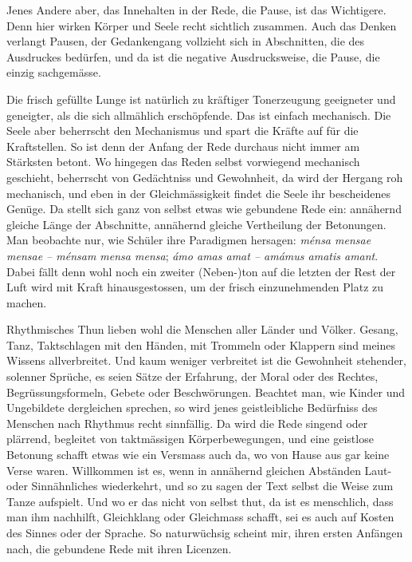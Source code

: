 {Jenes Andere aber, das Innehalten in der Rede, die Pause, ist das Wichtigere. Denn hier wirken Körper und Seele recht sichtlich zusammen. Auch \label{sp.226} das Denken verlangt Pausen, der Gedankengang vollzieht sich in Abschnitten, die des Ausdruckes bedürfen, und da ist die negative Ausdrucksweise, die Pause, die einzig sachgemässe.

Die frisch gefüllte Lunge ist natürlich zu kräftiger Tonerzeugung geeigneter und geneigter, als die sich allmählich erschöpfende. Das ist einfach mechanisch. Die Seele aber beherrscht den Mechanismus und \label{fp.224} spart die Kräfte auf für die Kraftstellen. So ist denn der Anfang der Rede durchaus nicht immer am Stärksten betont. Wo hingegen das Reden selbst vorwiegend mechanisch geschieht, beherrscht von Gedächtniss und Gewohnheit, da wird der Hergang roh mechanisch, und eben in der  Gleichmässigkeit findet die Seele ihr bescheidenes Genüge. Da stellt sich ganz von selbst etwas wie gebundene Rede ein: annähernd gleiche Länge der Abschnitte, annähernd gleiche Vertheilung der Betonungen. Man beobachte nur, wie Schüler ihre Paradigmen hersagen: \textit{ménsa mensae mensae – ménsam mensa mensa}; \textit{ámo amas amat – amámus amatis amant}. Dabei fällt denn wohl noch ein zweiter (Neben-)ton auf die letzten   der Rest der Luft wird mit Kraft hinausgestossen, um der frisch einzunehmenden Platz zu machen.

Rhythmisches Thun lieben wohl die Menschen aller Länder und Völker. Gesang, Tanz, Taktschlagen mit den Händen, mit Trommeln oder Klappern sind meines Wissens allverbreitet. Und kaum weniger verbreitet ist die Gewohnheit stehender, solenner Sprüche, es seien Sätze der Erfahrung, der Moral oder des Rechtes, Begrüssungsformeln, Gebete oder Beschwörungen. Beachtet man, wie Kinder und Ungebildete dergleichen sprechen, so wird jenes geistleibliche Bedürfniss des Menschen nach Rhythmus recht sinnfällig. Da wird die Rede singend oder plärrend, begleitet von taktmässigen Körperbewegungen, und eine geistlose Betonung schafft etwas wie ein Versmass auch da, wo von Hause aus gar keine Verse waren. Willkommen ist es, wenn in annähernd gleichen Abständen Laut- oder Sinnähnliches wiederkehrt, und so zu sagen der Text selbst die Weise zum Tanze aufspielt. Und wo er das nicht von selbst thut, da ist es menschlich, dass man ihm nachhilft, Gleichklang oder Gleichmass schafft, sei es auch auf Kosten des Sinnes oder der Sprache. So naturwüchsig scheint mir, ihren ersten Anfängen nach, die gebundene Rede mit ihren Licenzen.

}
